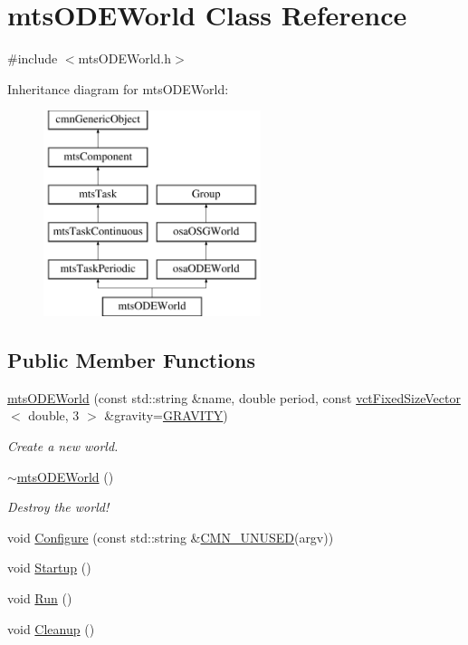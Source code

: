 \hypertarget{classmts_o_d_e_world}{\section{mts\-O\-D\-E\-World Class Reference}
\label{classmts_o_d_e_world}
}


{\ttfamily \#include $<$mts\-O\-D\-E\-World.\-h$>$}

Inheritance diagram for mts\-O\-D\-E\-World\-:\begin{figure}[H]
\begin{center}
\leavevmode
\includegraphics[height=6.000000cm]{da/d87/classmts_o_d_e_world}
\end{center}
\end{figure}
\subsection*{Public Member Functions}
\begin{DoxyCompactItemize}
\item 
\hyperlink{classmts_o_d_e_world_ad49af19a2073e37869cd814f49ef18de}{mts\-O\-D\-E\-World} (const std\-::string \&name, double period, const \hyperlink{classvct_fixed_size_vector}{vct\-Fixed\-Size\-Vector}$<$ double, 3 $>$ \&gravity=\hyperlink{classosa_o_d_e_world_ae1d291977a1d6305cea26a6bd87fa320}{G\-R\-A\-V\-I\-T\-Y})
\begin{DoxyCompactList}\small\item\em Create a new world. \end{DoxyCompactList}\item 
\hyperlink{classmts_o_d_e_world_a0258d0476537a288b9c8e1338c6ed308}{$\sim$mts\-O\-D\-E\-World} ()
\begin{DoxyCompactList}\small\item\em Destroy the world! \end{DoxyCompactList}\item 
void \hyperlink{classmts_o_d_e_world_a5dc51ea0cb5cfb120a9edbf67d2f0fa7}{Configure} (const std\-::string \&\hyperlink{cmn_portability_8h_a021894e2626935fa2305434b1e893ff6}{C\-M\-N\-\_\-\-U\-N\-U\-S\-E\-D}(argv))
\item 
void \hyperlink{classmts_o_d_e_world_aad2cbd02cb84d5bce6b9f04488d64b85}{Startup} ()
\item 
void \hyperlink{classmts_o_d_e_world_a9a5287b71830a7c814642c7c23448412}{Run} ()
\item 
void \hyperlink{classmts_o_d_e_world_a550824ddd1a7f7ade6f7d18b5b66b931}{Cleanup} ()
\end{DoxyCompactItemize}
